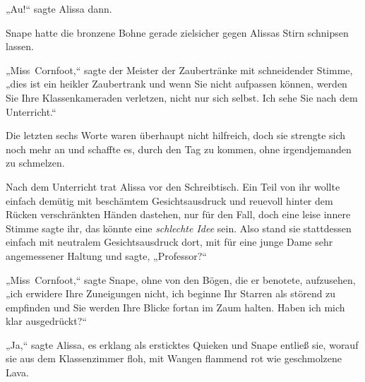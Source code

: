 „Au!“ sagte Alissa dann.

Snape hatte die bronzene Bohne gerade zielsicher gegen Alissas Stirn schnipsen lassen.

„Miss~Cornfoot,“ sagte der Meister der Zaubertränke mit schneidender Stimme, „dies ist ein heikler Zaubertrank und wenn Sie nicht aufpassen können, werden Sie Ihre Klassenkameraden verletzen, nicht nur sich selbst. Ich sehe Sie nach dem Unterricht.“

Die letzten sechs Worte waren überhaupt nicht hilfreich, doch sie strengte sich noch mehr an und schaffte es, durch den Tag zu kommen, ohne irgendjemanden zu schmelzen.

Nach dem Unterricht trat Alissa vor den Schreibtisch. Ein Teil von ihr wollte einfach demütig mit beschämtem Gesichtsausdruck und reuevoll hinter dem Rücken verschränkten Händen dastehen, nur für den Fall, doch eine leise innere Stimme sagte ihr, das könnte eine \emph{schlechte Idee} sein. Also stand sie stattdessen einfach mit neutralem Gesichtsausdruck dort, mit für eine junge Dame sehr angemessener Haltung und sagte, „Professor?“

„Miss~Cornfoot,“ sagte Snape, ohne von den Bögen, die er benotete, aufzusehen, „ich erwidere Ihre Zuneigungen nicht, ich beginne Ihr Starren als störend zu empfinden und Sie werden Ihre Blicke fortan im Zaum halten. Haben ich mich klar ausgedrückt?“

„Ja,“ sagte Alissa, es erklang als ersticktes Quieken und Snape entließ sie, worauf sie aus dem Klassenzimmer floh, mit Wangen flammend rot wie geschmolzene Lava.%

